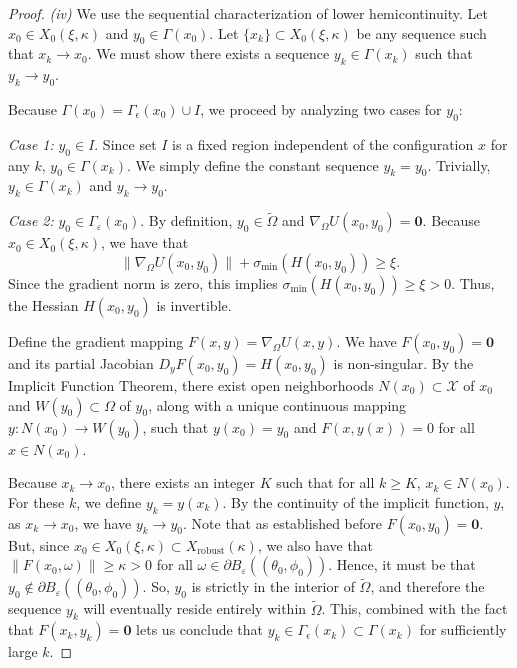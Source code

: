 \documentclass[11pt,letterpaper]{article}
\theoremstyle{definition}
\theoremstyle{plain}
\begin{document}
\begin{proof}
\smallskip\noindent\emph{(iv)} We use the sequential characterization of lower hemicontinuity. Let $x_0 \in X_0(\xi, \kappa)$ and $y_0 \in \Gamma(x_0)$. Let $\{x_k\} \subset X_0(\xi, \kappa)$ be any sequence such that $x_k \to x_0$. We must show there exists a sequence $y_k \in \Gamma(x_k)$ such that $y_k \to y_0$. 

Because $\Gamma(x_0) = \Gamma_\epsilon(x_0) \cup I$, we proceed by analyzing two cases for $y_0$:

\textit{Case 1:} $y_0 \in I$. 
Since set $I$ is a fixed region independent of the configuration $x$ for any $k$, $y_0 \in \Gamma(x_k)$. We simply define the constant sequence $y_k = y_0$. Trivially, $y_k \in \Gamma(x_k)$ and $y_k \to y_0$.

\textit{Case 2:} $y_0 \in \Gamma_\varepsilon(x_0)$. 
By definition, $y_0 \in \tilde{\Omega}$ and $\nabla_{\Omega} U(x_0, y_0) = \mathbf{0}$. Because $x_0 \in X_0(\xi, \kappa)$, we have that
$$ \|\nabla_{\Omega} U(x_0, y_0)\| + \sigma_{\min}(H(x_0, y_0)) \ge \xi. $$
Since the gradient norm is zero, this  implies $\sigma_{\min}(H(x_0, y_0)) \ge \xi > 0$. Thus, the Hessian $H(x_0, y_0)$ is invertible.

Define the gradient mapping $F(x, y) = \nabla_{\Omega} U(x, y)$. We have $F(x_0, y_0) = \mathbf{0}$ and its partial Jacobian $D_y F(x_0, y_0) = H(x_0, y_0)$ is non-singular. By the Implicit Function Theorem, there exist open neighborhoods $N(x_0) \subset \mathcal{X}$ of $x_0$ and $W(y_0) \subset \Omega$ of $y_0$, along with a unique continuous mapping $y: N(x_0) \to W(y_0)$, such that $y(x_0) = y_0$ and $F(x, y(x)) = 0$ for all $x \in N(x_0)$.

Because $x_k \to x_0$, there exists an integer $K$ such that for all $k \ge K$, $x_k \in N(x_0)$. For these $k$, we define $y_k = y(x_k)$. By the continuity of the implicit function, $y$, as $x_k \to x_0$, we have $y_k \to y_0$. Note that as established before $F(x_0,y_0) = \mathbf{0}$. But, since $x_0\in X_0(\xi, \kappa)\subset X_{\mathrm{robust}}(\kappa)$, we also have that $\|F(x_0, \omega)\|\geq \kappa>0$ for all $\omega\in \partial B_{\varepsilon}((\theta_0,\phi_0))$. Hence, it must be that $y_0\not\in \partial B_{\varepsilon}((\theta_0,\phi_0))$. So, $y_0$ is strictly in the interior of $\tilde{\Omega}$, and therefore the sequence $y_k$ will eventually reside entirely within $\tilde{\Omega}$. This, combined with the fact that $F(x_k,y_k) = \mathbf{0}$ lets us conclude that $y_k \in \Gamma_\epsilon(x_k) \subset \Gamma(x_k)$ for sufficiently large $k$.


\end{proof}
\end{document}

